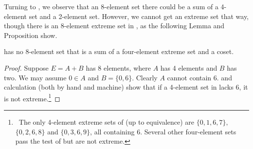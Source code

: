 Turning to , we observe that an 8-element set there could be a sum of a 4-element set and a 2-element set.
However, we cannot get an extreme set that way, though there is an 8-element extreme set in , as the
following Lemma and Proposition show.

\begin{lem}\label{lemsumsinZtwlv}
 has no 8-element set that is a sum of a four-element extreme set and a coset.
\end{lem}

\begin{proof}
Suppose $E= A+B$ has 8 elements, where $A$ has 4 elements and $B$ has two. We may assume $0\in A$ and $B=\{0,6\}$.
Clearly $A$ cannot contain 6.  and calculation (both by hand and machine) show that if a 4-element set in  
 lacks 6, it is not 
extreme.\footnote{\,
The only 4-element extreme sets of  (up to equivalence) 
are $\{0,1,6,7\},$ $\{0, 2,6,8\}$ and $\{0,3,6,9\}$, all containing 6. Several other four-element sets pass the test of
 but are not extreme.}%
\end{proof}


